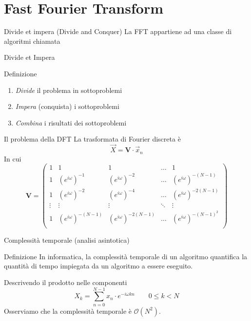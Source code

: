 \documentclass[10pt, xetex, handout]{beamer}
\begin{document}
\section{Fast Fourier Transform}
\begin{frame}{Divide et impera (Divide and Conquer)}
    La FFT appartiene ad una classe di algoritmi chiamata
    \begin{center}
        \Large Divide et Impera
    \end{center}

    \begin{block}{Definizione}
    \begin{enumerate}
        \item \emph{Divide} il problema in sottoproblemi
        \item \emph{Impera} (conquista) i sottoproblemi
        \item \emph{Combina} i risultati dei sottoproblemi
    \end{enumerate}
    \end{block}
\end{frame}

\begin{frame}{Il problema della DFT}
    La trasformata di Fourier discreta \`e
    \[
        \vec{X} = \mathbf{V}\cdot\vec{x}_n
    \]
    In cui
    \[
        \mathbf{V} = 
        \begin{pmatrix}
        1      & 1                      & 1                       & \dots  & 1                        \\[1em]
        1      & (e^{i\omega})^{-1}     & (e^{i\omega})^{-2}      & \dots  & (e^{i\omega})^{-(N-1)}   \\[1em]
        1      & (e^{i\omega})^{-2}     & (e^{i\omega})^{-4}      & \dots  & (e^{i\omega})^{-2(N-1)}  \\[1em]
        \vdots & \vdots                 &  \vdots                 & \ddots & \vdots                   \\[1em]
        1      & (e^{i\omega})^{-(N-1)} & (e^{i\omega})^{-2(N-1)} & \dots  & (e^{i\omega})^{-(N-1)^2} \\[1em]
        \end{pmatrix}
    \]
\end{frame}

\begin{frame}{Complessit\`a temporale (analisi asintotica)}
    \begin{block}{Definizione}
        In informatica, la complessità temporale di un algoritmo quantifica la
        quantità di tempo impiegata da un algoritmo a essere eseguito.
    \end{block}
    Descrivendo il prodotto nelle componenti
    \[
        X_k = \sum_{n=0}^{N-1} x_n\cdot e^{-i\omega kn}
        \qquad 0 \leq k < N
    \]
    Osserviamo che la complessit\`a temporale \`e \(\mathcal{O}(N^2)\).
\end{frame}
\end{document}
